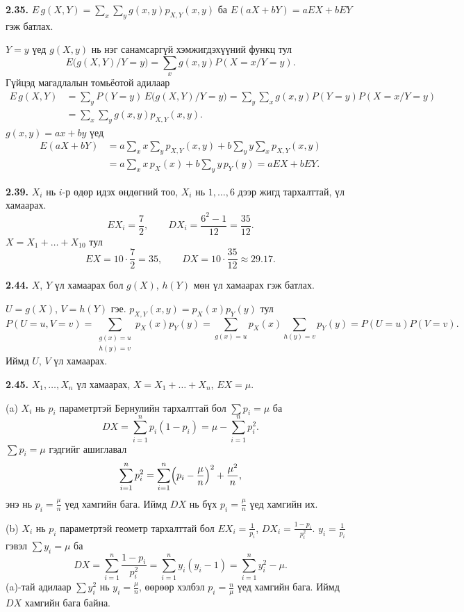\documentclass[11pt,a4paper]{article}
\newcommand{\bod}[1]{\par\medskip\noindent\textbf{#1}\quad}
\begin{document}
\bod{2.35.}
$E\,g(X,Y)=\sum_x\sum_yg(x,y)p_{X,Y}(x,y)$ ба $E(aX+bY)=aEX+bEY$ гэж батлах.

$Y=y$ үед $g(X,y)$ нь нэг санамсаргүй хэмжигдэхүүний функц тул
\[
E\bigl(g(X,Y)/Y=y\bigr)=\sum_xg(x,y)P(X=x/Y=y).
\]
Гүйцэд магадлалын томьёотой адилаар
\[
\begin{aligned}
E\,g(X,Y)&=\sum_yP(Y=y)\,E\bigl(g(X,Y)/Y=y\bigr)=\sum_y\sum_xg(x,y)P(Y=y)P(X=x/Y=y)\\
&=\sum_x\sum_yg(x,y)p_{X,Y}(x,y).
\end{aligned}
\]
$g(x,y)=ax+by$ үед
\[
\begin{aligned}
E(aX+bY)&=a\sum_xx\sum_yp_{X,Y}(x,y)+b\sum_yy\sum_xp_{X,Y}(x,y)\\
&=a\sum_xx\,p_X(x)+b\sum_yy\,p_Y(y)=aEX+bEY.
\end{aligned}
\]

\bod{2.39.}
$X_i$ нь $i$-р өдөр идэх өндөгний тоо, $X_i$ нь $1,\dots,6$ дээр жигд тархалттай, үл хамаарах.
\[
EX_i=\frac72,\qquad DX_i=\frac{6^2-1}{12}=\frac{35}{12}.
\]
$X=X_1+\dots+X_{10}$ тул
\[
EX=10\cdot\frac72=35,\qquad DX=10\cdot\frac{35}{12}\approx29.17 .
\]

\bod{2.44.}
$X$, $Y$ үл хамаарах бол $g(X)$, $h(Y)$ мөн үл хамаарах гэж батлах.

$U=g(X)$, $V=h(Y)$ гэе. $p_{X,Y}(x,y)=p_X(x)p_Y(y)$ тул
\[
P(U=u,V=v)=\sum_{\substack{g(x)=u\\h(y)=v}}p_X(x)p_Y(y)=\sum_{g(x)=u}p_X(x)\sum_{h(y)=v}p_Y(y)=P(U=u)P(V=v).
\]
Иймд $U$, $V$ үл хамаарах.

\bod{2.45.}
$X_1,\dots,X_n$ үл хамаарах, $X=X_1+\dots+X_n$, $EX=\mu$.

(a) $X_i$ нь $p_i$ параметртэй Бернулийн тархалттай бол $\sum p_i=\mu$ ба
\[
DX=\sum_{i=1}^np_i(1-p_i)=\mu-\sum_{i=1}^np_i^2 .
\]
$\sum p_i=\mu$ гэдгийг ашиглавал
\[
\sum_{i=1}^np_i^2=\sum_{i=1}^n\Bigl(p_i-\frac\mu n\Bigr)^2+\frac{\mu^2}{n},
\]
энэ нь $p_i=\frac\mu n$ үед хамгийн бага. Иймд $DX$ нь бүх $p_i=\frac\mu n$ үед хамгийн их.

(b) $X_i$ нь $p_i$ параметртэй геометр тархалттай бол $EX_i=\frac1{p_i}$, $DX_i=\frac{1-p_i}{p_i^2}$. $y_i=\frac1{p_i}$ гэвэл $\sum y_i=\mu$ ба
\[
DX=\sum_{i=1}^n\frac{1-p_i}{p_i^2}=\sum_{i=1}^ny_i(y_i-1)=\sum_{i=1}^ny_i^2-\mu .
\]
(a)-тай адилаар $\sum y_i^2$ нь $y_i=\frac\mu n$, өөрөөр хэлбэл $p_i=\frac n\mu$ үед хамгийн бага. Иймд $DX$ хамгийн бага байна.
\end{document}
